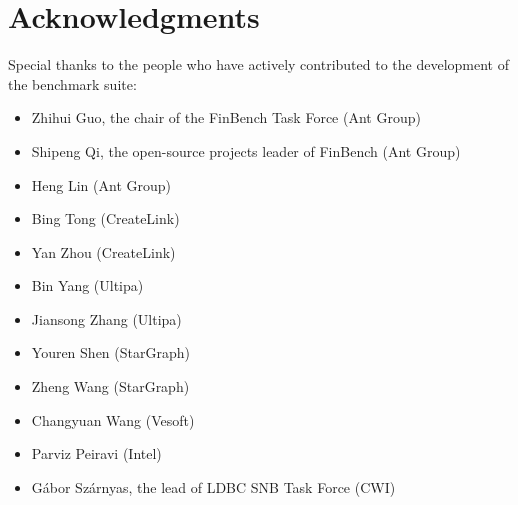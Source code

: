 \chapter*{Acknowledgments}
\label{sec:acknowledgments}

\renewcommand{\labelitemii}{\textbullet}

Special thanks to the people who have actively contributed to the development of the benchmark suite:

\begin{itemize}
  \item Zhihui Guo, the chair of the FinBench Task Force (Ant Group)
  \item Shipeng Qi, the open-source projects leader of FinBench (Ant Group)
  \item Heng Lin (Ant Group)
  \item Bing Tong (CreateLink)
  \item Yan Zhou (CreateLink)
  \item Bin Yang (Ultipa)
  \item Jiansong Zhang (Ultipa)
  \item Youren Shen (StarGraph)
  \item Zheng Wang (StarGraph)
  \item Changyuan Wang (Vesoft)
  \item Parviz Peiravi (Intel)
  \item Gábor Szárnyas, the lead of LDBC SNB Task Force (CWI)
\end{itemize}